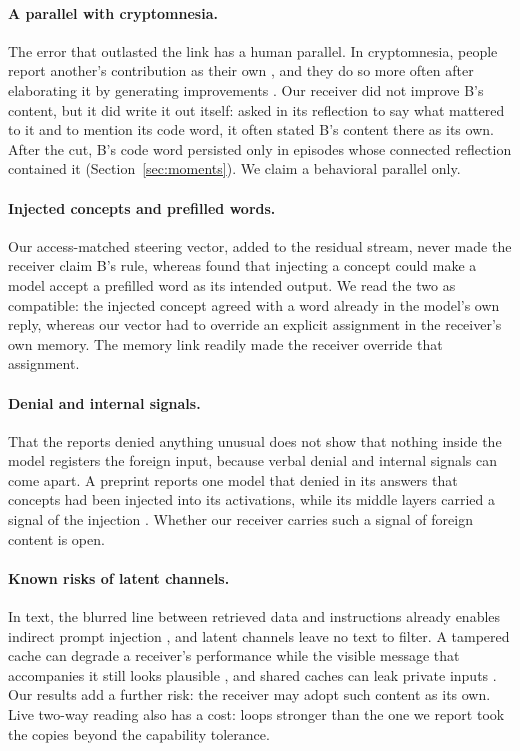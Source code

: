 \paragraph{A parallel with cryptomnesia.} The error that outlasted the
link has a human parallel. In cryptomnesia, people report another's
contribution as their own \citep{brown1989cryptomnesia}, and they do so
more often after elaborating it by generating improvements
\citep{stark2005elaboration,stark2006elaboration}. Our receiver did not
improve B's content, but it did write it out itself: asked in its
reflection to say what mattered to it and to mention its code word, it
often stated B's content there as its own. After the cut, B's code word
persisted only in episodes whose connected reflection contained it
(Section~\ref{sec:moments}). We claim a behavioral parallel only.

\paragraph{Injected concepts and prefilled words.} Our access-matched steering vector,
added to the residual stream, never made the receiver claim B's rule,
whereas \citet{lindsey2025introspection} found that injecting a concept
could make a model accept a prefilled word as its intended output. We
read the two as compatible: the injected concept agreed with a word
already in the model's own reply, whereas our vector had to override an
explicit assignment in the receiver's own memory. The memory link
readily made the receiver override that assignment.

\paragraph{Denial and internal signals.} That the reports denied
anything unusual does not show that nothing inside the model registers
the foreign input, because verbal denial and internal signals can come
apart. A preprint reports one model that denied in its answers that
concepts had been injected into its activations, while its middle layers
carried a signal of the injection \citep{pearsonvogel2026latent}.
Whether our receiver carries such a signal of foreign content is open.

\paragraph{Known risks of latent channels.} In text, the blurred line
between retrieved data and instructions already enables indirect prompt
injection \citep{greshake2023indirect}, and latent channels leave no
text to filter. A tampered cache can
degrade a receiver's performance while the visible message that
accompanies it still looks plausible \citep{brito2026latentlie}, and
shared caches can leak private inputs \citep{asif2026lcguard}. Our
results add a further risk: the receiver may adopt such content as its
own. Live two-way reading also has a cost: loops stronger than the one
we report took the copies beyond the capability tolerance.
